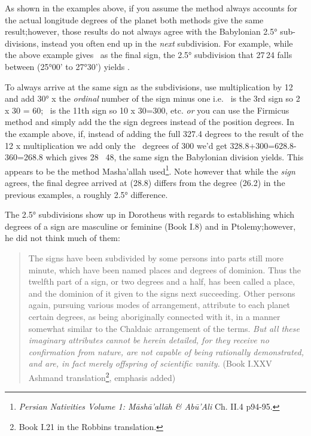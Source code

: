 As shown in the examples above, if you assume the method always accounts for the actual longitude degrees of the planet both methods give the same result;however, those results do not always agree with the Babylonian 2.5° sub-divisions, instead you often end up in the \textsl{next} subdivision. For example, while the above example gives \Capricorn\, as the final sign, the 2.5° subdivision that 27\Aquarius\,24 falls between (25°00' to 27°30') yields \Sagittarius.  

To always arrive at the same sign as the subdivisions, use multiplication by 12 and add 30° x the \textsl{ordinal} number of the sign minus one i.e. \Gemini\, is the 3rd sign so 2 x 30 = 60; \Aquarius\, is the 11th sign so 10 x 30=300, etc. \textsl{or} you can use the Firmicus method and simply add the the sign degrees instead of the position degrees. In the example above, if, instead of adding the full 327.4 degrees to the result of the 12 x multiplication we add only the \Aquarius\, degrees of 300 we'd get 328.8+300=628.8-360=268.8 which gives 28 \Sagittarius\, 48, the same sign the Babylonian division yields. This appears to be the method Masha'allah used\footnote{\textsl{Persian Nativities Volume 1: Māshā'allāh \& Abū'Ali} Ch. II.4 p94-95.}. Note however that while the \textsl{sign} agrees, the final degree arrived at (28.8) differs from the degree (26.2) in the previous examples, a roughly 2.5° difference.

The 2.5° subdivisions show up in Dorotheus with regards to establishing which degrees of a sign are masculine or feminine (Book I.8) and in Ptolemy;however, he did not think much of them:
\begin{quote}
The signs have been subdivided by some persons into parts still more minute, which have been named places and degrees of dominion. Thus the twelfth part of a sign, or two degrees and a half, has been called a place, and the dominion of it given to the signs next succeeding. Other persons again, pursuing various modes of arrangement, attribute to each planet certain degrees, as being aboriginally connected with it, in a manner somewhat similar to the Chaldaic arrangement of the terms. \textsl{But all these imaginary attributes cannot be herein detailed, for they receive no confirmation from nature, are not capable of being rationally demonstrated, and are, in fact merely offspring of scientific vanity.} (Book I.XXV Ashmand translation\footnote{Book I.21 in the Robbins translation.}, emphasis added)
\end{quote}

